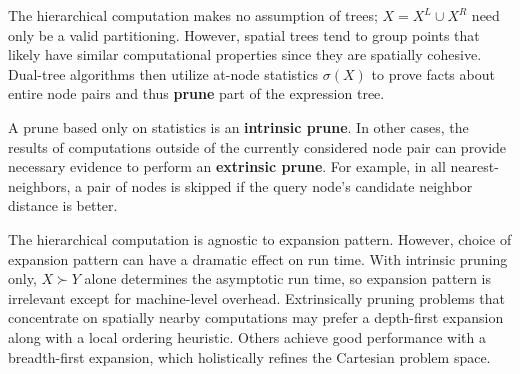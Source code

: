 \documentclass[twoside,leqno,twocolumn]{article}
\newcommand{\union}{\cup}
\newcommand{\prefsplit}[2]{#1 \succ #2}
\newcommand{\summary}{\delta}
\newcommand{\gnp}{\psi}
\newcommand{\defterm}[1]{{\bf #1}}
\newcommand{\kdroot}[1]{#1^{\text{root}}}
\newcommand{\kdleft}[1]{#1^{\!L}}
\newcommand{\kdright}[1]{#1^{\!R}}
\newcommand{\outstat}{\sigma}
\begin{document}
The hierarchical computation makes no assumption of trees; $X = \kdleft{X} \union \kdright{X}$ need only be a valid partitioning.
However, spatial trees tend to group points that likely have similar computational properties since they are spatially cohesive.
Dual-tree algorithms then utilize at-node statistics $\outstat(X)$ to prove facts about entire node pairs and thus \defterm{prune} part of the expression tree.

A prune based only on statistics is an \defterm{intrinsic prune}.
In other cases, the results of computations outside of the currently considered node pair can provide necessary evidence to perform an \defterm{extrinsic prune}.
For example, in all nearest-neighbors, a pair of nodes is skipped if the query node's candidate neighbor distance is better.



The hierarchical computation is agnostic to expansion pattern.
However, choice of expansion pattern can have a dramatic effect on run time.
With intrinsic pruning only, $\prefsplit{X}{Y}$ alone determines the asymptotic run time, so expansion pattern is irrelevant except for machine-level overhead.
Extrinsically pruning problems that concentrate on spatially nearby computations may prefer a depth-first expansion along with a local ordering heuristic.
Others achieve good performance with a breadth-first expansion, which holistically refines the Cartesian problem space.
\end{document}
